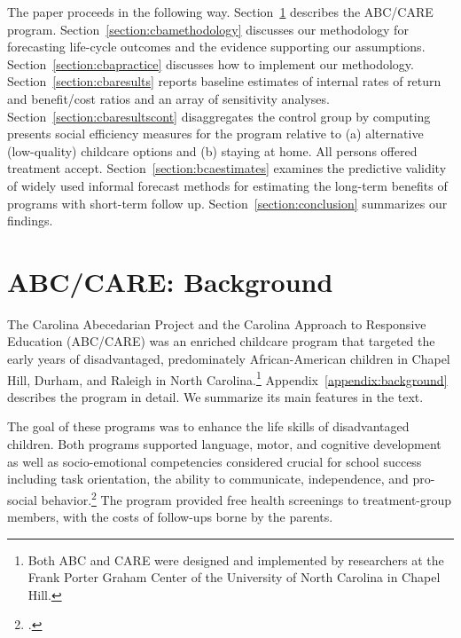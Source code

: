 The paper proceeds in the following way. Section~\ref{section:background} describes the ABC/CARE program. Section~\ref{section:cbamethodology} discusses our methodology for forecasting life-cycle outcomes and the evidence supporting our assumptions. Section~\ref{section:cbapractice} discusses how to implement our methodology. Section~\ref{section:cbaresults} reports baseline estimates of internal rates of return and benefit/cost ratios and an array of sensitivity analyses. Section~\ref{section:cbaresultscont} disaggregates the control group by computing presents social efficiency measures for the program relative to (a) alternative (low-quality) childcare options and (b) staying at home. All persons offered treatment accept. Section~\ref{section:bcaestimates} examines the predictive validity of widely used informal forecast methods for estimating the long-term benefits of programs with short-term follow up. Section~\ref{section:conclusion} summarizes our findings.

\section{ABC/CARE: Background} \label{section:background}

The Carolina Abecedarian Project and the Carolina Approach to Responsive Education (ABC/CARE) was an enriched childcare program that targeted the early years of disadvantaged, predominately African-American children in Chapel Hill, Durham, and Raleigh in North Carolina.\footnote{Both ABC and CARE were designed and implemented by researchers at the Frank Porter Graham Center of the University of North Carolina in Chapel Hill.} Appendix~\ref{appendix:background} describes the program in detail. We summarize its main features in the text.

The goal of these programs was to enhance the life skills of disadvantaged children. Both programs supported language, motor, and cognitive development as well as socio-emotional competencies considered crucial for school success including task orientation, the ability to communicate, independence, and pro-social behavior.\footnote{\citet{Sparling_1974_Synth_Edu_Infant_SPEECH, Ramey_Collier_etal_1976_CarolinaAbecedarianProject, Ramey_etal_1985_Project-CARE_TiECSE, Wasik_Ramey_etal_1990_CD, Ramey-etal_2012-ABC}.} The program provided free health screenings to treatment-group members, with the costs of follow-ups borne by the parents.

